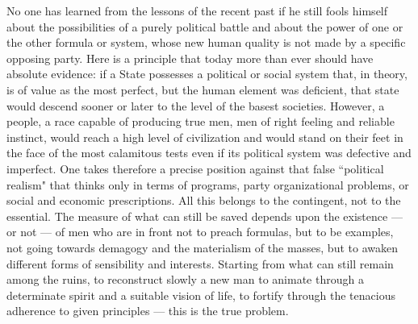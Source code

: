 No one has learned from the lessons of the recent past if he still fools himself about the possibilities of a purely political battle and about the power of one or the other formula or system, whose new human quality is not made by a specific opposing party. Here is a principle that today more than ever should have absolute evidence: if a State possesses a political or social system that, in theory, is of value as the most perfect, but the human element was deficient, that state would descend sooner or later to the level of the basest societies. However, a people, a race capable of producing true men, men of right feeling and reliable instinct, would reach a high level of civilization and would stand on their feet in the face of the most calamitous tests even if its political system was defective and imperfect. One takes therefore a precise position against that false ``political realism" that thinks only in terms of programs, party organizational problems, or social and economic prescriptions. All this belongs to the contingent, not to the essential. The measure of what can still be saved depends upon the existence — or not — of men who are in front not to preach formulas, but to be examples, not going towards demagogy and the materialism of the masses, but to awaken different forms of sensibility and interests. Starting from what can still remain among the ruins, to reconstruct slowly a new man to animate through a determinate spirit and a suitable vision of life, to fortify through the tenacious adherence to given principles — this is the true problem.

